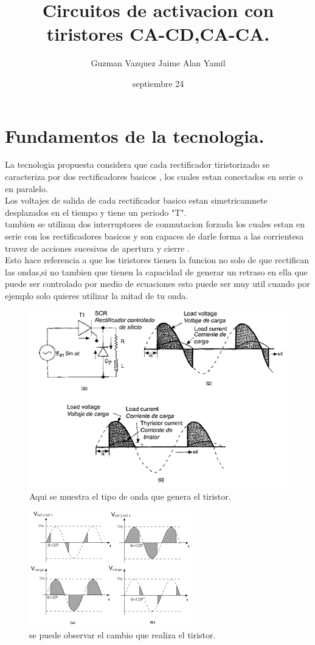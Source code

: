 \documentclass[12pt]{article}
\title{\textbf{Circuitos de activacion con tiristores CA-CD,CA-CA.}}
\author{Guzman Vazquez Jaime Alan Yamil}
\date{septiembre 24}
\begin{document}
\maketitle

\section{Fundamentos de la tecnologia.}

La tecnologia propuesta considera que cada rectificador tiristorizado se caracteriza por dos  rectificadores basicos , los cuales estan conectados en serie o en paralelo.\\
Los voltajes de salida  de cada rectificador basico estan simetricamnete desplazados  en el tiempo y tiene un periodo "T".\\
tambien se utilizan dos interruptores de conmutacion forzada los cuales estan en serie con los rectificadores basicos y son capaces de darle forma a las corrientesa travez de acciones sucesivas de apertura y cierre  .\\
Esto hace referencia a que los tiristores tienen la funcion no solo de que rectifican las ondas,si no tambien que tienen la capacidad de generar un retraso en ella que puede ser controlado por medio de ecuaciones esto puede ser muy util cuando por ejemplo solo quieres utilizar la mitad de tu onda.  
\begin{figure}[htp]
\centering
\includegraphics[scale=0.50]{ac_dc.jpg}
\caption{Aqui se muestra el tipo de onda que genera el tiristor.}
\label{}
\end{figure}
\begin{figure}[htp]
\centering
\includegraphics[scale=1]{onda ac-ac.png}
\caption{se puede observar el cambio que realiza el tiristor.}
\label{}
\end{figure}
\end{document}
